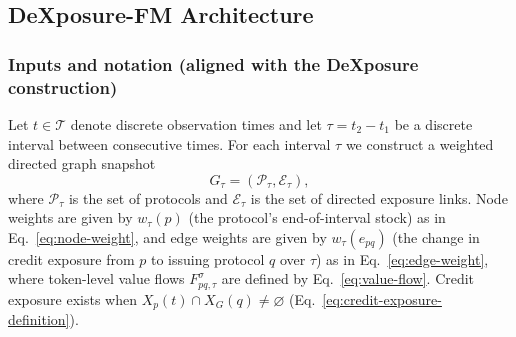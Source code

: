 %

\subsection{DeXposure-FM Architecture}
\label{sec:dexposure-fm-architecture}


\subsubsection{Inputs and notation (aligned with the DeXposure construction)}
Let $t\in\mathcal{T}$ denote discrete observation times and let $\tau = t_2-t_1$ be a discrete interval between consecutive times.
For each interval $\tau$ we construct a weighted directed graph snapshot
\begin{equation}
G_{\tau}=(\mathcal{P}_{\tau},\mathcal{E}_{\tau}),
\end{equation}
where $\mathcal{P}_{\tau}$ is the set of protocols and $\mathcal{E}_{\tau}$ is the set of directed exposure links.
Node weights are given by $w_{\tau}(p)$ (the protocol's end-of-interval stock) as in Eq.~\eqref{eq:node-weight}, and edge weights are given by $w_{\tau}(e_{pq})$ (the change in credit exposure from $p$ to issuing protocol $q$ over $\tau$) as in Eq.~\eqref{eq:edge-weight}, where token-level value flows $F^{\sigma}_{pq,\tau}$ are defined by Eq.~\eqref{eq:value-flow}. Credit exposure exists when $X_p(t)\cap X_G(q)\neq\varnothing$ (Eq.~\eqref{eq:credit-exposure-definition}).

